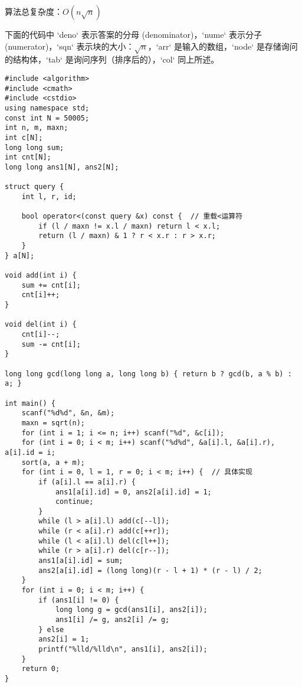 算法总复杂度：$O(n\sqrt{n} )$

下面的代码中 `deno` 表示答案的分母 (denominator)，`nume` 表示分子 (numerator)，`sqn` 表示块的大小：$\sqrt{n}$，`arr` 是输入的数组，`node` 是存储询问的结构体，`tab` 是询问序列（排序后的），`col` 同上所述。

\begin{lstlisting}
#include <algorithm>
#include <cmath>
#include <cstdio>
using namespace std;
const int N = 50005;
int n, m, maxn;
int c[N];
long long sum;
int cnt[N];
long long ans1[N], ans2[N];

struct query {
	int l, r, id;
	
	bool operator<(const query &x) const {  // 重载<运算符
		if (l / maxn != x.l / maxn) return l < x.l;
		return (l / maxn) & 1 ? r < x.r : r > x.r;
	}
} a[N];

void add(int i) {
	sum += cnt[i];
	cnt[i]++;
}

void del(int i) {
	cnt[i]--;
	sum -= cnt[i];
}

long long gcd(long long a, long long b) { return b ? gcd(b, a % b) : a; }

int main() {
	scanf("%d%d", &n, &m);
	maxn = sqrt(n);
	for (int i = 1; i <= n; i++) scanf("%d", &c[i]);
	for (int i = 0; i < m; i++) scanf("%d%d", &a[i].l, &a[i].r), a[i].id = i;
	sort(a, a + m);
	for (int i = 0, l = 1, r = 0; i < m; i++) {  // 具体实现
		if (a[i].l == a[i].r) {
			ans1[a[i].id] = 0, ans2[a[i].id] = 1;
			continue;
		}
		while (l > a[i].l) add(c[--l]);
		while (r < a[i].r) add(c[++r]);
		while (l < a[i].l) del(c[l++]);
		while (r > a[i].r) del(c[r--]);
		ans1[a[i].id] = sum;
		ans2[a[i].id] = (long long)(r - l + 1) * (r - l) / 2;
	}
	for (int i = 0; i < m; i++) {
		if (ans1[i] != 0) {
			long long g = gcd(ans1[i], ans2[i]);
			ans1[i] /= g, ans2[i] /= g;
		} else
		ans2[i] = 1;
		printf("%lld/%lld\n", ans1[i], ans2[i]);
	}
	return 0;
}
\end{lstlisting}